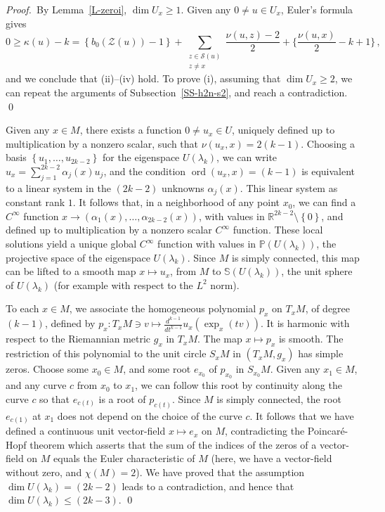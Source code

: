 \documentclass[12pt,a4paper]{amsart}
\theoremstyle{plain} %
\theoremstyle{definition}
\numberwithin{equation}{section}
\numberwithin{figure}{section}
\numberwithin{table}{section}
\newcommand{\bP}{\mathbb{P}}
\newcommand{\R}{\mathbb{R}}
\newcommand{\bS}{\mathbb{S}}
\newcommand{\cS}{\mathcal{S}}
\newcommand{\cZ}{\mathcal{Z}}
\DeclareMathOperator{\ord}{ord}
\newcommand{\pf}{\emph{Proof.~}}
\newcommand{\sm}{\!\setminus\!}
\newcommand{\set}[1]{\left\lbrace #1 \right\rbrace}
\begin{document}
\pf By Lemma~\ref{L-zeroi}, $\dim U_x \ge 1$. Given any $0 \not = u \in U_x$, Euler's formula gives
%
\begin{equation}\label{E-h2n-10}
0 \ge \kappa(u) - k = \left\lbrace b_0(\cZ(u)) - 1\right\rbrace + \sum_{\substack{z \in \cS(u)\\ z \not = x}} \frac{\nu(u,z) - 2}{2} + \lbrace \frac{\nu(u,x)}{2} - k + 1 \rbrace\,,
\end{equation}
%
and we conclude that (ii)--(iv) hold. To prove (i), assuming that $\dim U_x \ge 2$, we can repeat the arguments of Subsection~\ref{SS-h2n-s2}, and reach a contradiction. \hfill \qed \medskip

Given any $x \in M$, there exists a function $0 \neq u_x \in U$, uniquely defined up to multiplication by a nonzero scalar, such that $\nu(u_x,x) = 2(k-1)$. Choosing a basis $\set{u_1,\dots,u_{2k-2}}$ for the eigenspace $U(\lambda_k)$, we can write $u_x = \sum_{j=1}^{2k-2} \alpha_j(x) u_j$, and the condition $\ord(u_x,x)=(k-1)$ is equivalent to a linear system in the $(2k-2)$ unknowns $\alpha_j(x)$. This linear system as constant rank $1$. It follows that,   in a neighborhood of any point $x_0$, we can find a $C^{\infty}$ function $x \to (\alpha_1(x),\ldots,\alpha_{2k-2}(x))$, with values in $\R^{2k-2}\sm \set{0}$, and defined up to multiplication by a nonzero scalar $C^{\infty}$ function. These local solutions yield a unique global $C^{\infty}$ function with values in $\bP(U(\lambda_k))$, the projective space of the eigenspace $U(\lambda_k)$. Since $M$ is simply connected, this map can be lifted to a smooth map $x \mapsto u_x$, from $M$ to $\bS(U(\lambda_k))$, the unit sphere of $U(\lambda_k)$ (for example with respect to the $L^2$ norm). \medskip

 To each $x \in M$, we associate the homogeneous polynomial $p_x$ on $T_xM$, of degree $(k-1)$, defined by $p_x : T_xM \ni v \mapsto \frac{d^{k-1}}{dt^{k-1}} u_x(\exp_x(tv))$. It is harmonic with respect to the Riemannian metric $g_x$ in $T_xM$. The map $x \mapsto p_x$ is smooth. The restriction of this polynomial to the unit circle $S_xM$ in $(T_xM,g_x)$ has simple zeros. Choose some $x_0 \in M$, and some root $e_{x_0}$ of $p_{x_0}$ in $S_{x_0}M$. Given any $x_1 \in M$, and any curve $c$ from $x_0$ to $x_1$, we can follow this root by continuity along the curve $c$ so that $e_{c(t)}$ is a root of $p_{c(t)}$. Since $M$ is simply connected, the root $e_{c(1)}$ at $x_1$ does not depend on the choice of the curve $c$. It follows that we have defined a continuous unit vector-field $x \mapsto e_x$ on $M$, contradicting the Poincar\'e-Hopf theorem \cite[p.~35]{Miln1997} which asserts that the sum of the indices of the zeros of a vector-field on $M$ equals the Euler characteristic of $M$ (here, we have a vector-field without zero, and $\chi(M)=2$). We have proved that the assumption $\dim U(\lambda_k) = (2k-2)$ leads to a contradiction, and hence that $\dim U(\lambda_k) \le (2k-3)$. \hfill \qed
\end{document}
